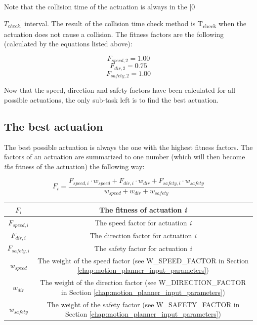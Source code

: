 Note that the collision time of the actuation is always in the [0 {$T_{check}$] interval. The result of the collision time check method is T\textsubscript{check} when the actuation does not cause a collision. The fitness factors are the following (calculated by the equations listed above):

\[ F_{speed,2} = 1.00 \]
\[ F_{dir,2} = 0.75 \]
\[ F_{safety,2} = 1.00 \]

Now that the speed, direction and safety factors have been calculated for all possible actuations, the only sub-task left is to find the best actuation.

\begin{minipage}{\textwidth}
\subsection{The best actuation}

The best possible actuation is always the one with the highest fitness factors. The factors of an actuation are summarized to one number (which will then become \textit{the} fitness of the actuation) the following way:

\begin{equation}\label{eq:fitness_factor}
F_{i} = \frac{F_{speed,i} \cdot w_{speed} + F_{dir,i} \cdot w_{dir} + F_{safety,i} \cdot w_{safety}}{w_{speed} + w_{dir} + w_{safety}}
\end{equation}

\end{minipage}

\begin{center}
    \begin{tabular}{ | c | c | }
        \hline
        $F_{i}$         & The fitness of actuation \textit{i}                                                                                     \\
        \hline
        $F_{speed,i}$   & The speed factor for actuation \textit{i}                                                                               \\
        \hline
        $F_{dir,i}$     & The direction factor for actuation \textit{i}                                                                           \\
        \hline
        $F_{safety,i}$  & The safety factor for actuation \textit{i}                                                                              \\
        \hline
        $w_{speed}$     & The weight of the speed factor (see W\_SPEED\_FACTOR in Section \ref{chap:motion_planner_input_parameters})             \\
        \hline
        $w_{dir}$       & The weight of the direction factor (see W\_DIRECTION\_FACTOR in Section \ref{chap:motion_planner_input_parameters})     \\
        \hline
        $w_{safety}$    & The weight of the safety factor (see W\_SAFETY\_FACTOR in Section \ref{chap:motion_planner_input_parameters})           \\
        \hline
    \end{tabular}
\end{center}

}
